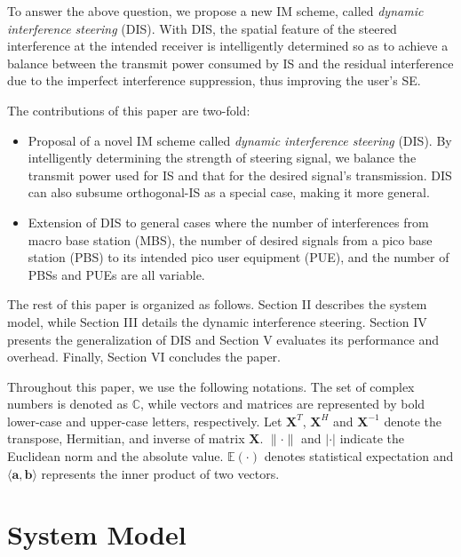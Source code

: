 \documentclass[10pt, conference, letterpaper]{IEEEtran}
\begin{document}
To answer the above question, we propose a new IM scheme, called \textit{dynamic interference steering} (DIS).
With DIS, the spatial feature of the steered interference at the intended receiver
is intelligently determined so as to achieve a balance between the transmit power consumed by IS and the
residual interference due to the imperfect interference suppression, thus improving the user's SE.

The contributions of this paper are two-fold:

\begin{itemize}
\item Proposal of a novel IM scheme called \textit{dynamic interference steering} (DIS).
By intelligently determining the strength of steering signal, we balance the transmit power
used for IS and that for the desired signal's transmission. DIS can also subsume orthogonal-IS
as a special case, making it more general.
\item Extension of DIS to general cases where the number of interferences from macro base station (MBS),
the number of desired signals from a pico base station (PBS) to its intended pico user equipment (PUE),
and the number of PBSs and PUEs are all variable.
\end{itemize}

The rest of this paper is organized as follows.
Section II describes the system model, while Section III details the dynamic interference steering.
Section IV presents the generalization of DIS and
Section V evaluates its performance and overhead.
Finally, Section VI concludes the paper.

Throughout this paper, we use the following notations. The set of complex numbers
is denoted as $\mathbb{C}$, while vectors and matrices are represented by bold
lower-case and upper-case letters, respectively. Let $\mathbf{X}^{T}$,
$\mathbf{X}^{H}$ and $\mathbf{X}^{-1}$ denote the transpose, Hermitian,
and inverse of matrix $\mathbf{X}$.
$\|\cdot\|$ and $|\cdot|$ indicate the Euclidean norm and the absolute value.
$\mathbb{E}(\cdot)$ denotes statistical expectation and $\langle\mathbf{a}, \mathbf{b}\rangle$
represents the inner product of two vectors.

\section{System Model}
\end{document}
